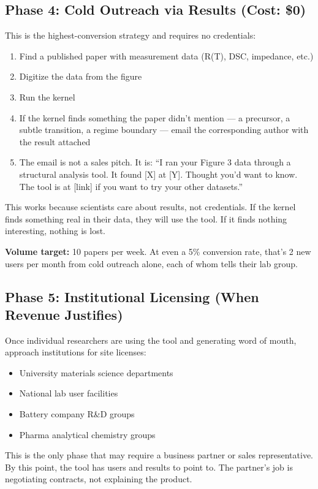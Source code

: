 \documentclass[11pt,letterpaper]{article}
\begin{document}
\subsection{Phase 4: Cold Outreach via Results (Cost: \$0)}

This is the highest-conversion strategy and requires no credentials:
\begin{enumerate}
  \item Find a published paper with measurement data (R(T), DSC,
    impedance, etc.)
  \item Digitize the data from the figure
  \item Run the kernel
  \item If the kernel finds something the paper didn't mention ---
    a precursor, a subtle transition, a regime boundary --- email
    the corresponding author with the result attached
  \item The email is not a sales pitch. It is: ``I ran your Figure 3
    data through a structural analysis tool. It found [X] at [Y].
    Thought you'd want to know. The tool is at [link] if you want
    to try your other datasets.''
\end{enumerate}

This works because scientists care about results, not credentials.
If the kernel finds something real in their data, they will use
the tool. If it finds nothing interesting, nothing is lost.

\textbf{Volume target:} 10 papers per week. At even a 5\% conversion
rate, that's 2 new users per month from cold outreach alone, each of
whom tells their lab group.

\subsection{Phase 5: Institutional Licensing (When Revenue Justifies)}

Once individual researchers are using the tool and generating word of
mouth, approach institutions for site licenses:
\begin{itemize}
  \item University materials science departments
  \item National lab user facilities
  \item Battery company R\&D groups
  \item Pharma analytical chemistry groups
\end{itemize}

This is the only phase that may require a business partner or sales
representative. By this point, the tool has users and results to
point to. The partner's job is negotiating contracts, not explaining
the product.
\end{document}
